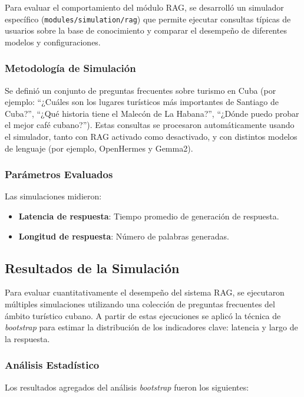 \documentclass[runningheads]{llncs}
\begin{document}
Para evaluar el comportamiento del módulo RAG, se desarrolló un simulador específico (\texttt{modules/simulation/rag}) que permite ejecutar consultas típicas de usuarios sobre la base de conocimiento y comparar el desempeño de diferentes modelos y configuraciones.

\subsubsection{Metodología de Simulación}

Se definió un conjunto de preguntas frecuentes sobre turismo en Cuba (por ejemplo: ``¿Cuáles son los lugares turísticos más importantes de Santiago de Cuba?'', ``¿Qué historia tiene el Malecón de La Habana?'', ``¿Dónde puedo probar el mejor café cubano?''). Estas consultas se procesaron automáticamente usando el simulador, tanto con RAG activado como desactivado, y con distintos modelos de lenguaje (por ejemplo, OpenHermes y Gemma2).

\subsubsection{Parámetros Evaluados}

Las simulaciones midieron:
\begin{itemize}
    \item \textbf{Latencia de respuesta}: Tiempo promedio de generación de respuesta.
    \item \textbf{Longitud de respuesta}: Número de palabras generadas.

\end{itemize}

\subsection{Resultados de la Simulación}

Para evaluar cuantitativamente el desempeño del sistema RAG, se ejecutaron múltiples simulaciones utilizando una colección de preguntas frecuentes del ámbito turístico cubano. A partir de estas ejecuciones se aplicó la técnica de \textit{bootstrap} para estimar la distribución de los indicadores clave: latencia y largo de la respuesta.

\subsubsection{Análisis Estadístico}

Los resultados agregados del análisis \textit{bootstrap} fueron los siguientes:
\end{document}
